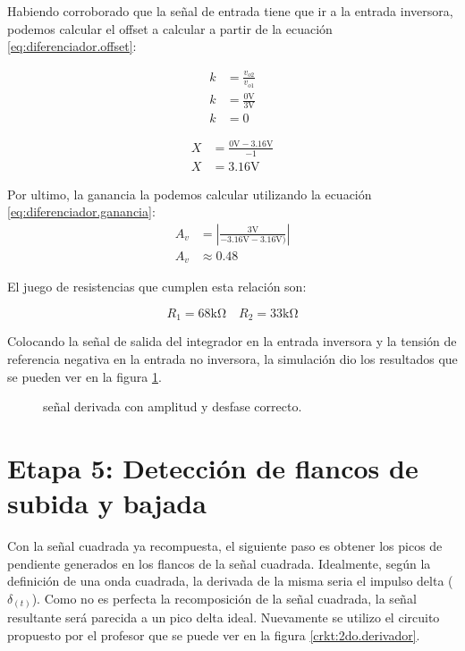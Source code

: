 Habiendo corroborado que la señal de entrada tiene que ir a la entrada inversora, podemos calcular el offset a calcular
a partir de la ecuación \ref{eq:diferenciador.offset}:
\begin{figure}[!ht]
  \centering
  \begin{subfigure}[t]{0.45\textwidth}
    \begin{align*}
      k &= \frac{v_{o2}}{v_{o1}} \\
      k &= \frac{0 \si{\volt}}{3 \si{\volt}} \\
      k &= 0
    \end{align*}
  \end{subfigure}
  \hspace{.5cm}
  \begin{subfigure}[t]{0.45\textwidth}
    \begin{align*}
      X &= \frac{0 \si{\volt} - 3.16 \si{\volt}}{- 1} \\
      X &= 3.16 \si{\volt}
    \end{align*}
  \end{subfigure}
\end{figure}

Por ultimo, la ganancia la podemos calcular utilizando la ecuación \ref{eq:diferenciador.ganancia}:
\begin{align*}
  A_v &= \left| \frac{3 \si{\volt}}{-3.16 \si{\volt} - 3.16 \si{\volt})} \right| \\
  A_v &\approx 0.48
\end{align*}

El juego de resistencias que cumplen esta relación son:

\begin{equation*}
  R_1 = 68 \si{\kilo \ohm} \quad R_2 = 33 \si{\kilo \ohm}
\end{equation*}

Colocando la señal de salida del integrador en la entrada inversora y la tensión de referencia negativa en la entrada no
inversora, la simulación dio los resultados que se pueden ver en la figura \ref{plot:derivador}.

\begin{figure}[!ht]
  \centering
  
  \caption{señal derivada con amplitud y desfase correcto.}
  \label{plot:derivador}
\end{figure}

\section{Etapa 5: Detección de flancos de subida y bajada}
Con la señal cuadrada ya recompuesta, el siguiente paso es obtener los picos de pendiente generados en los flancos de la
señal cuadrada. Idealmente, según la definición de una onda cuadrada, la derivada de la misma seria el impulso delta
($\delta_{(t)}$). Como no es perfecta la recomposición de la señal cuadrada, la señal resultante será parecida a un pico
delta ideal. Nuevamente se utilizo el circuito propuesto por el profesor que se puede ver en la figura
\ref{crkt:2do.derivador}.

